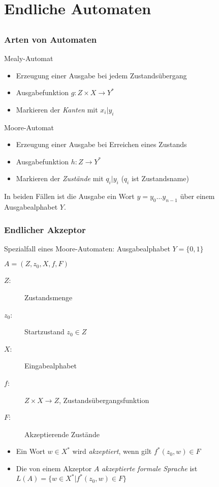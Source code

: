 \section{Endliche Automaten}
\subsection*{}
\begin{frame}
  \frametitle{Arten von Automaten}
  \begin{block}{Mealy-Automat}
    \begin{itemize}
      \item Erzeugung einer Ausgabe bei jedem Zustandsübergang
      \item Ausgabefunktion $g: Z \times X \rightarrow Y^*$
      \item Markieren der \emph{Kanten} mit $x_i|y_i$
    \end{itemize}
   \end{block}
  \pause
  \begin{block}{Moore-Automat}
    \begin{itemize}
      \item Erzeugung einer Ausgabe bei Erreichen eines Zustands
      \item Ausgabefunktion $h: Z \rightarrow Y^*$
      \item Markieren der \emph{Zustände} mit $q_i|y_i$ ($q_i$ ist Zustandsname)
    \end{itemize}
  \end{block}

  In beiden Fällen ist die Ausgabe ein Wort $y = y_0\ldots y_{n-1}$ über einem
  Ausgabealphabet $Y$.
\end{frame}

\begin{frame}
  \frametitle{Endlicher Akzeptor}
  Spezialfall eines Moore-Automaten: Ausgabealphabet $Y = \{0, 1\}$
  \begin{definition}
    $A = (Z, z_0, X, f, F)$
    \begin{description}
      \item[$Z$:] Zustandsmenge
      \item[$z_0$:] Startzustand $z_0 \in Z$
      \item[$X$:] Eingabealphabet
      \item[$f$:] $Z \times X \longrightarrow Z$, Zustandsübergangsfunktion
      \item[$F$:] Akzeptierende Zustände
    \end{description}
  \end{definition}
  \begin{itemize}
    \item Ein Wort $w\in X^*$ wird \emph{akzeptiert}, wenn gilt $f^*(z_0,w)\in F$
    \item Die von einem Akzeptor $A$ \emph{akzeptierte formale Sprache} ist $L(A)=\{w \in X^* |f^*(z_0,w)\in F\}$
   \end{itemize}
\end{frame}

